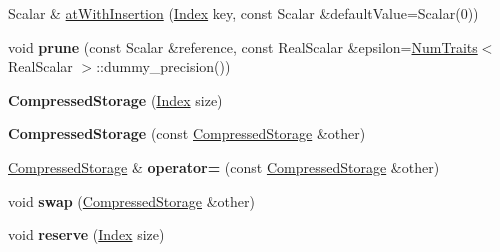 \begin{DoxyCompactItemize}
\item 
Scalar \& \hyperlink{class_eigen_1_1internal_1_1_compressed_storage_a8621aa0d1d0e27b025d41b9321968357}{at\+With\+Insertion} (\hyperlink{namespace_eigen_a62e77e0933482dafde8fe197d9a2cfde}{Index} key, const Scalar \&default\+Value=Scalar(0))
\item 
\mbox{\label{class_eigen_1_1internal_1_1_compressed_storage_ab82e42c20bd4522475aec0dd61835259}} 
void {\bfseries prune} (const Scalar \&reference, const Real\+Scalar \&epsilon=\hyperlink{group___core___module_struct_eigen_1_1_num_traits}{Num\+Traits}$<$ Real\+Scalar $>$\+::dummy\+\_\+precision())
\item 
\mbox{\label{class_eigen_1_1internal_1_1_compressed_storage_a259255414bcca5b0f874422b814adcd8}} 
{\bfseries Compressed\+Storage} (\hyperlink{namespace_eigen_a62e77e0933482dafde8fe197d9a2cfde}{Index} size)
\item 
\mbox{\label{class_eigen_1_1internal_1_1_compressed_storage_a58e4d0458b53f8261fbb6547ae2c5cb7}} 
{\bfseries Compressed\+Storage} (const \hyperlink{class_eigen_1_1internal_1_1_compressed_storage}{Compressed\+Storage} \&other)
\item 
\mbox{\label{class_eigen_1_1internal_1_1_compressed_storage_a76413b8626d4ef2bd1681cbfb7d16dbd}} 
\hyperlink{class_eigen_1_1internal_1_1_compressed_storage}{Compressed\+Storage} \& {\bfseries operator=} (const \hyperlink{class_eigen_1_1internal_1_1_compressed_storage}{Compressed\+Storage} \&other)
\item 
\mbox{\label{class_eigen_1_1internal_1_1_compressed_storage_ab767a66ceffd14d21475675eb4f6fb23}} 
void {\bfseries swap} (\hyperlink{class_eigen_1_1internal_1_1_compressed_storage}{Compressed\+Storage} \&other)
\item 
\mbox{\label{class_eigen_1_1internal_1_1_compressed_storage_a1c32b23ec703d56e9087ae378f96c311}} 
void {\bfseries reserve} (\hyperlink{namespace_eigen_a62e77e0933482dafde8fe197d9a2cfde}{Index} size)
\item 

\end{DoxyCompactItemize}

